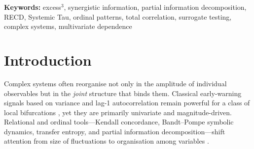 \documentclass[11pt,a4paper]{article}
\begin{document}
\begin{abstract}
We validate the construction on four synthetic arms: independent AR(1)
channels (near-null), a shared-latent coupling jump (planted joint
reorganisation), coupled logistic maps, and a pure pairwise control
($R=\NumR$ realisations, $B=\NumB$ phase-shuffle surrogates, $T=\NumT$).
Under reference hyperparameters, phase-shuffle tests on
$|\Delta\mathrm{excess3}|$ behave as predicted for null vs.\ planted
structure: the near-null arm (G0) has mean $\Delta=\GzeroDelta$ and median
$p=\GzeroMedP$ ($\GzeroFrac$ of realisations with $p<0.05$), while planted
shared-latent reorganisation (G1) yields mean $\Delta=\GoneDelta$, median
$p=\GoneMedP$, and $\GoneFrac$ extreme realisations (two-sided; the sign is
negative under this generator because stronger common coupling inflates
pairwise baselines relative to residual multiinformation). The logistic arm
(G2) is near-null in this design (mean $\Delta=\GtwoDelta$); the pairwise
control (G3) is intermediate (mean $\Delta=\GthreeDelta$, median
$p=\GthreeMedP$). At the reference binary threshold $\theta_3=0.08$,
$\Phi_3$ occupancy saturates on these generators because continuous
excess$^3$ lives near $O(1)$; discrimination resides in continuous $\Delta$.
We close with estimation caveats, downstream uses, the path to excess$^k$,
and explicit limitations. Scope is directional synthetic validation under a
pre-specified protocol---not a multi-domain empirical atlas---so that later
applied papers can cite a frozen Level-3 contract rather than re-derive ad~hoc
variants.
\end{abstract}

\noindent\textbf{Keywords:}
excess$^3$, synergistic information, partial information decomposition,
RECD, Systemic Tau, ordinal patterns, total correlation, surrogate testing,
complex systems, multivariate dependence

\vspace{0.4cm}

\section{Introduction}
\label{sec:intro}

Complex systems often reorganise not only in the amplitude of individual
observables but in the \emph{joint} structure that binds them. Classical
early-warning signals based on variance and lag-1 autocorrelation remain
powerful for a class of local bifurcations \citep{Scheffer2009,Dakos2012}, yet
they are primarily univariate and magnitude-driven. Relational and ordinal
tools---Kendall concordance, Bandt--Pompe symbolic dynamics, transfer
entropy, and partial information decomposition---shift attention from size
of fluctuations to organisation among variables
\citep{Kendall1938,BandtPompe2002,Schreiber2000,Williams2010}.
\end{document}
